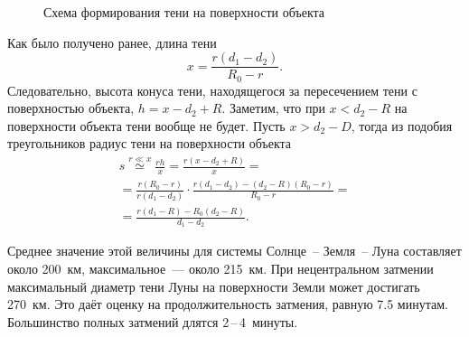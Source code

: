 \begin{figure}[h!]
    \caption{Схема формирования тени на поверхности объекта}
    \label{pic:shadow-size-on-surface}    
\end{figure}

Как было получено ранее, длина тени
\begin{equation*}
    x = \frac{r (d_1 - d_2)}{R_0 - r}.
\end{equation*}
Следовательно, высота конуса тени, находящегося за пересечением тени с поверхностью объекта, $h = x - d_2 + R$. Заметим, что при $x < d_2 - R$ на поверхности объекта тени вообще не будет. Пусть $x > d_2 - D$, тогда из подобия треугольников радиус тени на поверхности объекта
\begin{multline}
    s 
        \overset{r \ll x}{\simeq} \frac{r h}{x} 
        = \frac{r(x - d_2 + R)}{x} = \\
        = \frac{r (R_0 - r)}{r (d_1 - d_2)} \cdot \frac{r(d_1 - d_2) - (d_2 - R)(R_0 - r)}{R_0 - r} = \\
        = \frac{r (d_1 - R) - R_0 (d_2 - R)}{d_1 - d_2}.
\end{multline}

Среднее значение этой величины для системы Солнце~-- Земля~-- Луна составляет около 200~км, максимальное~--- около 215~км. При нецентральном затмении максимальный диаметр тени Луны на поверхности Земли может достигать 270~км. Это даёт оценку на продолжительность затмения, равную 7.5 минутам. Большинство полных затмений длятся 2\,--\,4~минуты.

